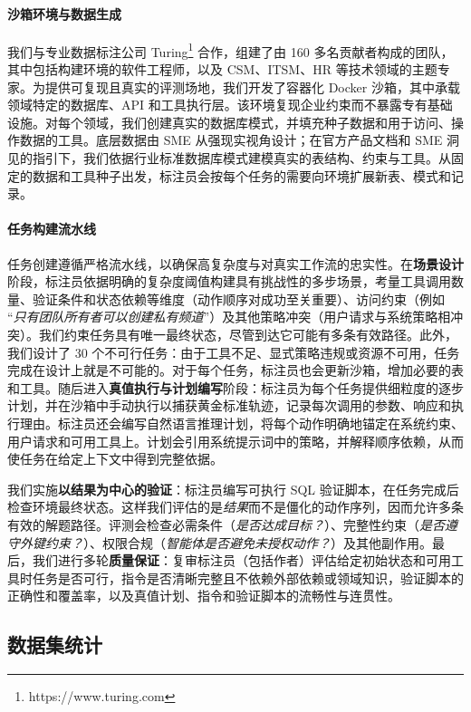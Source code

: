 \paragraph{沙箱环境与数据生成}
我们与专业数据标注公司 Turing\footnote{https://www.turing.com} 合作，组建了由 160 多名贡献者构成的团队，其中包括构建环境的软件工程师，以及 CSM、ITSM、HR 等技术领域的主题专家。为提供可复现且真实的评测场地，我们开发了容器化 Docker 沙箱，其中承载领域特定的数据库、API 和工具执行层。该环境复现企业约束而不暴露专有基础设施。对每个领域，我们创建真实的数据库模式，并填充种子数据和用于访问、操作数据的工具。底层数据由 SME 从强现实视角设计；在官方产品文档和 SME 洞见的指引下，我们依据行业标准数据库模式建模真实的表结构、约束与工具。从固定的数据和工具种子出发，标注员会按每个任务的需要向环境扩展新表、模式和记录。

\paragraph{任务构建流水线}
任务创建遵循严格流水线，以确保高复杂度与对真实工作流的忠实性。在\textbf{场景设计}阶段，标注员依据明确的复杂度阈值构建具有挑战性的多步场景，考量工具调用数量、验证条件和状态依赖等维度（动作顺序对成功至关重要）、访问约束（例如 ``\textit{只有团队所有者可以创建私有频道}''）及其他策略冲突（用户请求与系统策略相冲突）。我们约束任务具有唯一最终状态，尽管到达它可能有多条有效路径。此外，我们设计了 30 个不可行任务：由于工具不足、显式策略违规或资源不可用，任务完成在设计上就是不可能的。对于每个任务，标注员也会更新沙箱，增加必要的表和工具。随后进入\textbf{真值执行与计划编写}阶段：标注员为每个任务提供细粒度的逐步计划，并在沙箱中手动执行以捕获黄金标准轨迹，记录每次调用的参数、响应和执行理由。标注员还会编写自然语言推理计划，将每个动作明确地锚定在系统约束、用户请求和可用工具上。计划会引用系统提示词中的策略，并解释顺序依赖，从而使任务在给定上下文中得到完整依据。

我们实施\textbf{以结果为中心的验证}：标注员编写可执行 SQL 验证脚本，在任务完成后检查环境最终状态。这样我们评估的是\emph{结果}而不是僵化的动作序列，因而允许多条有效的解题路径。评测会检查必需条件（\emph{是否达成目标？}）、完整性约束（\emph{是否遵守外键约束？}）、权限合规（\emph{智能体是否避免未授权动作？}）及其他副作用。最后，我们进行多轮\textbf{质量保证}：复审标注员（包括作者）评估给定初始状态和可用工具时任务是否可行，指令是否清晰完整且不依赖外部依赖或领域知识，验证脚本的正确性和覆盖率，以及真值计划、指令和验证脚本的流畅性与连贯性。

\subsection{数据集统计}
\label{subsec:statistics}


